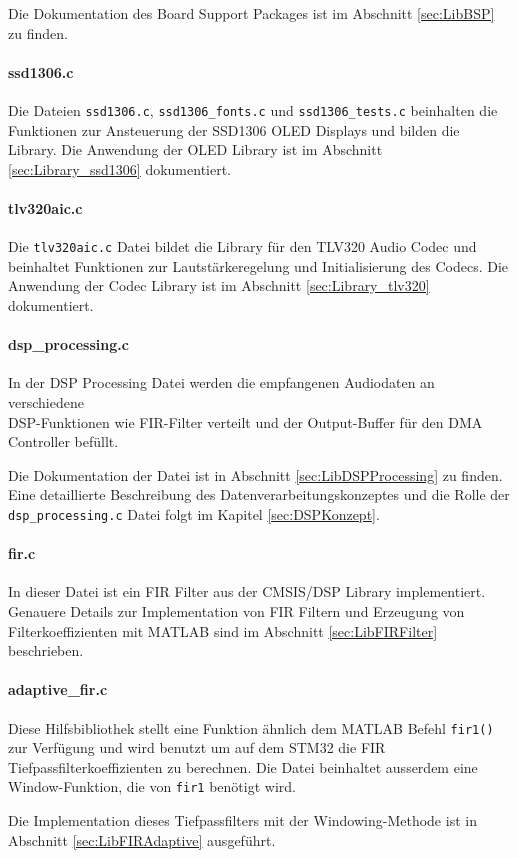 Die Dokumentation des Board Support Packages ist im Abschnitt \ref{sec:LibBSP} zu finden.

\paragraph{ssd1306.c}

Die Dateien \texttt{ssd1306.c}, \texttt{ssd1306\_fonts.c} und \texttt{ssd1306\_tests.c} beinhalten die Funktionen zur Ansteuerung der SSD1306 OLED Displays und bilden die Library.
Die Anwendung der OLED Library ist im Abschnitt \ref{sec:Library_ssd1306} dokumentiert.

\paragraph{tlv320aic.c}

Die \texttt{tlv320aic.c} Datei bildet die Library für den TLV320 Audio Codec und beinhaltet Funktionen zur Lautstärkeregelung und Initialisierung des Codecs.
Die Anwendung der Codec Library ist im Abschnitt \ref{sec:Library_tlv320} dokumentiert.


\paragraph{dsp\_processing.c}

In der DSP Processing Datei werden die empfangenen Audiodaten an verschiedene \\
DSP-Funktionen wie FIR-Filter verteilt und der Output-Buffer für den DMA Controller befüllt.

Die Dokumentation der Datei ist in Abschnitt \ref{sec:LibDSPProcessing} zu finden.
Eine detaillierte Beschreibung des Datenverarbeitungskonzeptes und die Rolle der \texttt{dsp\_processing.c} Datei folgt im Kapitel \ref{sec:DSPKonzept}.

\paragraph{fir.c}

In dieser Datei ist ein FIR Filter aus der CMSIS/DSP Library implementiert.
Genauere Details zur Implementation von FIR Filtern und Erzeugung von Filterkoeffizienten mit MATLAB sind im Abschnitt \ref{sec:LibFIRFilter} beschrieben.

\paragraph{adaptive\_fir.c}

Diese Hilfsbibliothek stellt eine Funktion ähnlich dem MATLAB Befehl \texttt{fir1()} zur Verfügung und wird benutzt um auf dem STM32 die FIR Tiefpassfilterkoeffizienten zu berechnen.
Die Datei beinhaltet ausserdem eine Window-Funktion, die von \texttt{fir1} benötigt wird.

Die Implementation dieses Tiefpassfilters mit der Windowing-Methode ist in Abschnitt \ref{sec:LibFIRAdaptive} ausgeführt.

